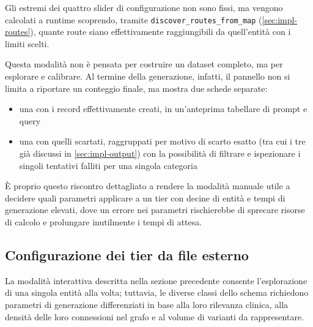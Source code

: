\documentclass[12pt,a4paper,openright,twoside]{book}
\begin{document}
Gli estremi dei quattro slider di configurazione non sono fissi, ma vengono
calcolati a runtime scoprendo, tramite \texttt{discover\_routes\_from\_map}
(\cref{sec:impl-routes}), quante route siano effettivamente raggiungibili da
quell'entità con i limiti scelti.


Questa modalità non è pensata per costruire un dataset completo, ma per
esplorare e calibrare. Al termine della generazione, infatti, il pannello non si
limita a riportare un conteggio finale, ma mostra due schede separate:
\begin{itemize}
    \item una con i record effettivamente creati, in un'anteprima tabellare di
          prompt e query
    \item una con quelli scartati, raggruppati per motivo di scarto esatto (tra
          cui i tre già discussi in \cref{sec:impl-output}) con la possibilità
          di filtrare e ispezionare i singoli tentativi falliti per una singola
          categoria
\end{itemize}

È proprio questo riscontro dettagliato a rendere la modalità manuale utile a
decidere quali parametri applicare a un tier con decine di entità e tempi di
generazione elevati, dove un errore nei parametri rischierebbe di sprecare
risorse di calcolo e prolungare inutilmente i tempi di attesa.

\subsection{Configurazione dei tier da file esterno}
\label{sec:impl-tier-config}

La modalità interattiva descritta nella sezione precedente consente
l'esplorazione di una singola entità alla volta; tuttavia, le diverse classi
dello schema richiedono parametri di generazione differenziati in base alla loro
rilevanza clinica, alla densità delle loro connessioni nel grafo e al volume di
varianti da rappresentare.
\end{document}
